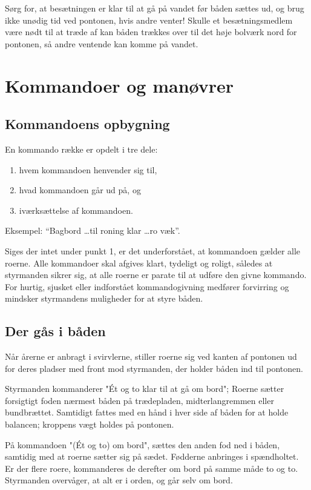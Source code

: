 \documentclass{article}
\begin{document}
Sørg for, at besætningen er klar til at gå på vandet før båden sættes ud,
og brug ikke unødig tid ved pontonen, hvis andre venter! Skulle et
besætningsmedlem være nødt til at træde af kan båden trækkes over til det
høje bolværk nord for pontonen, så andre ventende kan komme på vandet.

\section{Kommandoer og manøvrer}

\subsection{Kommandoens opbygning}

En kommando række er opdelt i tre dele:

\begin{enumerate}
    \item hvem kommandoen henvender sig til,
    \item hvad kommandoen går ud på, og
    \item iværksættelse af kommandoen.
\end{enumerate}

Eksempel: ``Bagbord \ldots til roning klar \ldots ro væk''.

Siges der intet under punkt 1, er det underforstået, at kommandoen gælder
alle roerne. Alle kommandoer skal afgives klart, tydeligt og roligt,
således at styrmanden sikrer sig, at alle roerne er parate til at udføre
den givne kommando. For hurtig, sjusket eller indforstået kommandogivning
medfører forvirring og mindsker styrmandens muligheder for at styre
båden.

\subsection{Der gås i båden}

Når årerne er anbragt i svirvlerne, stiller roerne sig ved kanten af
pontonen ud for deres pladser med front mod styrmanden, der holder båden
ind til pontonen.

Styrmanden kommanderer "Ét og to klar til at gå om bord"; Roerne sætter
forsigtigt foden nærmest båden på trædepladen, midterlangremmen eller
bundbrættet. Samtidigt fattes med en hånd i hver side af båden for at
holde balancen; kroppens vægt holdes på pontonen.

På kommandoen "(Ét og to) om bord", sættes den anden fod ned i båden,
samtidig med at roerne sætter sig på sædet. Fødderne anbringes i
spændholtet.  Er der flere roere, kommanderes de derefter om bord på
samme måde to og to.  Styrmanden overvåger, at alt er i orden, og går
selv om bord.
\end{document}
